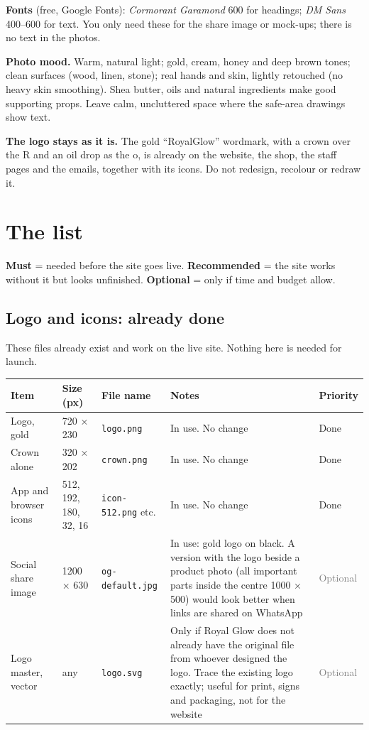\documentclass[11pt,a4paper]{article}
\newcommand{\key}[1]{{\footnotesize\texttt{#1}}}
\newcommand{\opt}{\textcolor{gray}{Optional}}
\begin{document}
\textbf{Fonts} (free, Google Fonts): \emph{Cormorant Garamond} 600 for headings; \emph{DM Sans} 400--600 for text. You only need these for the share image or mock-ups; there is no text in the photos.

\textbf{Photo mood.} Warm, natural light; gold, cream, honey and deep brown tones; clean surfaces (wood, linen, stone); real hands and skin, lightly retouched (no heavy skin smoothing). Shea butter, oils and natural ingredients make good supporting props. Leave calm, uncluttered space where the safe-area drawings show text.

\textbf{The logo stays as it is.} The gold ``RoyalGlow'' wordmark, with a crown over the R and an oil drop as the o, is already on the website, the shop, the staff pages and the emails, together with its icons. Do not redesign, recolour or redraw it.

\section{The list}\label{sec:list}
\textbf{Must} = needed before the site goes live. \textbf{Recommended} = the site works without it but looks unfinished. \textbf{Optional} = only if time and budget allow.

\subsection{Logo and icons: already done}
These files already exist and work on the live site. Nothing here is needed for launch.

\begin{longtable}{@{}P{3.2cm} P{2.1cm} P{3.9cm} P{3.75cm} l@{}}
\toprule
\textbf{Item} & \textbf{Size (px)} & \textbf{File name} & \textbf{Notes} & \textbf{Priority} \\ \midrule\endhead
Logo, gold & 720 × 230 & \key{logo.png} & In use. No change & Done \\
Crown alone & 320 × 202 & \key{crown.png} & In use. No change & Done \\
App and browser icons & 512, 192, 180, 32, 16 & \key{icon-512.png} etc. & In use. No change & Done \\
Social share image & 1200 × 630 & \key{og-default.jpg} & In use: gold logo on black. A version with the logo beside a product photo (all important parts inside the centre 1000 × 500) would look better when links are shared on WhatsApp & \opt \\
Logo master, vector & any & \key{logo.svg} & Only if Royal Glow does not already have the original file from whoever designed the logo. Trace the existing logo exactly; useful for print, signs and packaging, not for the website & \opt \\ \bottomrule
\end{longtable}
\end{document}
